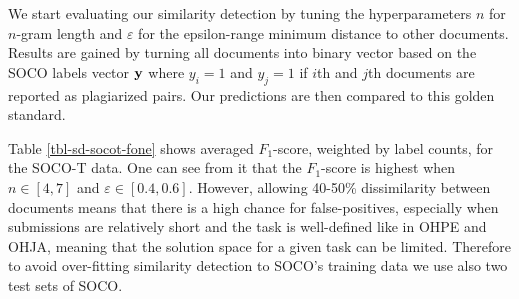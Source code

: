 
We start evaluating our similarity detection by tuning the hyperparameters $n$ for $n$-gram length and $\varepsilon$ for the epsilon-range \ie minimum distance to other documents. Results are gained by turning all documents into binary vector based on the SOCO labels \ie vector $\mathbf{y}$ where $y_i = 1$ and $y_j = 1$ if $i$th and $j$th documents are reported as plagiarized pairs. Our predictions are then compared to this golden standard.

Table \ref{tbl-sd-socot-fone} shows averaged $F_1$-score, weighted by label counts, for the SOCO-T data. One can see from it that the $F_1$-score is highest when $n \in [4, 7]$ and $\varepsilon \in [0.4, 0.6]$. However, allowing 40-50\% dissimilarity between documents means that there is a high chance for false-positives, especially when submissions are relatively short and the task is well-defined like in OHPE and OHJA, meaning that the solution space for a given task can be limited. Therefore to avoid over-fitting similarity detection to SOCO's training data we use also two test sets of SOCO.   

\newpage

\begin{table}[ht]
\centering
\caption{Average $F_1$-score for $n$-gram length and $\varepsilon$-range for SOCO-T containing 115 cases of plagiarism. The smaller the $\varepsilon$-range is, the more similar documents have to be. $F_1$-scores close or over 0.8 are bolded.}
\label{tbl-sd-socot-fone}
\end{table}




